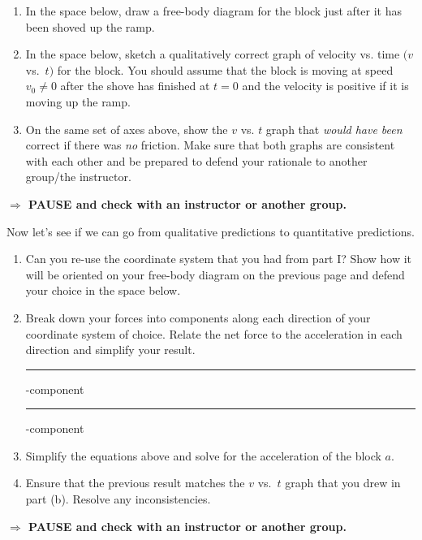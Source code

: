 \documentclass[12pt,hidelinks]{article}
\newcommand{\checkin}{{\bf \noindent $\Rightarrow$ PAUSE and check with an instructor or another
  group.}}
\begin{document}
\begin{enumerate}
  \item In the space below, draw a free-body diagram for the block just after it has been
  shoved up the ramp. \vspace{1.5in}
  \item In the space below, sketch a qualitatively correct graph of velocity vs. time $(v$ vs.\
  $t)$ for the block.  You should assume that the block is moving at speed $v_0\neq 0$ after the
  shove has finished at $t=0$ and the velocity is positive if it is moving up the ramp.
  \begin{center}
  \end{center}
  \item On the same set of axes above, show the $v$ vs. $t$ graph that \textit{would have been}
  correct if there was \textit{no} friction.  Make sure that both graphs are consistent with
  each other and be prepared to defend your rationale to another group/the instructor. \vfill
\end{enumerate}

\checkin
\newpage

\noindent
Now let's see if we can go from qualitative predictions to quantitative predictions.
\begin{enumerate}[resume]
  \item Can you re-use the coordinate system that you had from part \textrm{I}? Show how it
  will be oriented on your free-body diagram on the previous page and defend your choice in the
  space below. \vspace{1in}
  \item Break down your forces into components along each direction of your coordinate system
  of choice.  Relate the net force to the acceleration in each direction and simplify your
  result. \vspace{0.1in}

  \rule{0.5in}{0.5pt}-component \hspace{0.35\textwidth} \rule{0.5in}{0.5pt}-component
  \vspace{2in}
  \item Simplify the equations above and solve for the acceleration of the block $a$.
  \vspace{2in}
  \item Ensure that the previous result matches the $v$ vs.\ $t$ graph that you drew in part
  (b). Resolve any inconsistencies.
\end{enumerate}
\vfill \checkin
\end{document}
